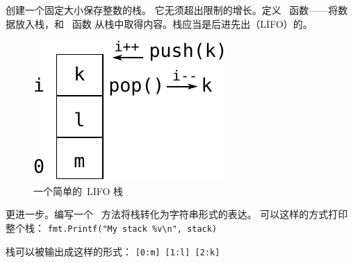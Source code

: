 \begin{Exercise}[title={栈},difficulty=5]
\label{ex:stack}
\Question \label{ex:stack q1} 创建一个固定大小保存整数的栈。
它无须超出限制的增长。定义~ 函数——将数据放入栈，和~ 函数
从栈中取得内容。栈应当是后进先出（LIFO）的。

\begin{figure}[H]
\caption{一个简单的~LIFO 栈}
\label{fig:stack}
\begin{center}
\includegraphics[scale=0.65]{fig/stack.pdf}
\end{center}
\end{figure}

\Question \label{ex:stack q2} 更进一步。编写一个~ 方法将栈转化为字符串形式的表达。
可以这样的方式打印整个栈：
\lstinline{fmt.Printf("My stack %v\n", stack)}

\noindent{}栈可以被输出成这样的形式：
\texttt{[0:m] [1:l] [2:k]}

\end{Exercise}

